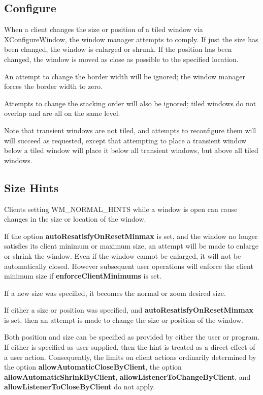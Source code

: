 \subsection{Configure}

When a client changes the size or position of a tiled window via
XConfigureWindow, the window manager attempts to comply.
If just the size has been changed, the window is enlarged or shrunk.
If the position has been changed, the window is moved as close as
possible to the specified location.

An attempt to change the border width will be ignored; the window manager
forces the border width to zero.

Attempts to change the stacking order will also be ignored; tiled windows
do not overlap and are all on the same level.

Note that transient windows are not tiled, and attempts to reconfigure
them will will succeed as requested, except that attempting to
place a transient window below a tiled window will place it below all
transient windows, but above all tiled windows.

\subsection{Size Hints}

Clients setting {\sc WM\_NORMAL\_HINTS} while
a window is open can cause changes in the size or location of the
window.

If the option {\bf autoResatisfyOnResetMinmax} is set,
and the window no longer satisfies its client minimum or maximum size,
an attempt will be made to enlarge or shrink the window.  Even if the
window cannot be enlarged, it will not be automatically closed.
However subsequent user operations will enforce the client minimum size
if {\bf enforceClientMinimums} is set.

If a new size was specified, it becomes the normal or zoom desired size.

If either a size or position was specified, and
{\bf autoResatisfyOnResetMinmax} is set, then an attempt is made to
change the size or position of the window.

Both position and size can be specified as provided by either the user or
program.  If either is specified as user supplied, then the hint
is treated as a direct effect of a user action.  Consequently, the
limits on client actions ordinarily determined by the option
{\bf allowAutomaticCloseByClient}, the option
{\bf allowAutomaticShrinkByClient},
{\bf allowListenerToChangeByClient}, and
{\bf allowListenerToCloseByClient} do not apply.

